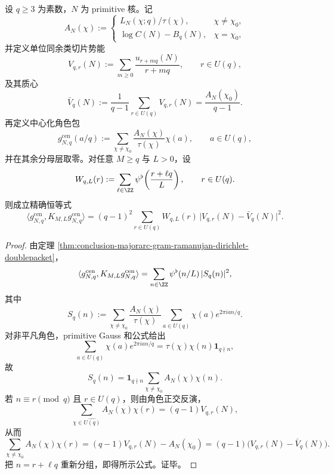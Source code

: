 \begin{theorem}\label{thm:conclusion-prime-conductor-centered-slice-gram-fourier-identity}
设 \(q\ge 3\) 为素数，\(N\) 为 primitive 核。记
\[
A_N(\chi):=
\begin{cases}
L_N(\chi;q)/\tau(\chi), & \chi\neq \chi_0,\\[4pt]
\log C(N)-B_q(N), & \chi=\chi_0,
\end{cases}
\]
并定义单位同余类切片势能
\[
V_{q,r}(N):=\sum_{m\ge 0}\frac{u_{r+mq}(N)}{r+mq},
\qquad r\in U(q),
\]
及其质心
\[
\bar V_q(N):=\frac{1}{q-1}\sum_{r\in U(q)}V_{q,r}(N)
=
\frac{A_N(\chi_0)}{q-1}.
\]
再定义中心化角色包
\[
g_{N,q}^{\mathrm{cen}}(a/q):=
\sum_{\chi\neq \chi_0}\frac{A_N(\chi)}{\tau(\chi)}\chi(a),
\qquad a\in U(q),
\]
并在其余分母层取零。对任意 \(M\ge q\) 与 \(L>0\)，设
\[
W_{q,L}(r):=\sum_{\ell\in\ZZ}\psi^{\flat}\!\left(\frac{r+\ell q}{L}\right),
\qquad r\in U(q).
\]
则成立精确恒等式
\[
\langle g_{N,q}^{\mathrm{cen}},K_{M,L}g_{N,q}^{\mathrm{cen}}\rangle
=
(q-1)^2
\sum_{r\in U(q)}W_{q,L}(r)\,
\bigl|V_{q,r}(N)-\bar V_q(N)\bigr|^2.
\]
\end{theorem}
\begin{proof}
由定理 \ref{thm:conclusion-majorarc-gram-ramanujan-dirichlet-doublepacket}，
\[
\langle g_{N,q}^{\mathrm{cen}},K_{M,L}g_{N,q}^{\mathrm{cen}}\rangle
=
\sum_{n\in\ZZ}\psi^{\flat}(n/L)\,|S_q(n)|^2,
\]
其中
\[
S_q(n):=
\sum_{\chi\neq \chi_0}\frac{A_N(\chi)}{\tau(\chi)}
\sum_{a\in U(q)}\chi(a)e^{2\pi ian/q}.
\]
对非平凡角色，primitive Gauss 和公式给出
\[
\sum_{a\in U(q)}\chi(a)e^{2\pi ian/q}
=
\tau(\chi)\chi(n)\mathbf 1_{q\nmid n},
\]
故
\[
S_q(n)
=
\mathbf 1_{q\nmid n}\sum_{\chi\neq \chi_0}A_N(\chi)\chi(n).
\]
若 \(n\equiv r\pmod q\) 且 \(r\in U(q)\)，则由角色正交反演，
\[
\sum_{\chi\in \widehat{U(q)}}A_N(\chi)\chi(r)=(q-1)V_{q,r}(N),
\]
从而
\[
\sum_{\chi\neq \chi_0}A_N(\chi)\chi(r)
=(q-1)V_{q,r}(N)-A_N(\chi_0)
=(q-1)\bigl(V_{q,r}(N)-\bar V_q(N)\bigr).
\]
把 \(n=r+\ell q\) 重新分组，即得所示公式。证毕。
\end{proof}

